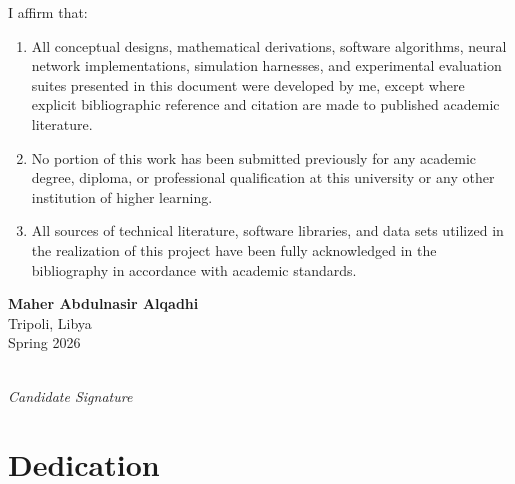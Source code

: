 \documentclass[12pt,a4paper,oneside]{report}
\begin{document}
I affirm that:
\begin{enumerate}
    \item All conceptual designs, mathematical derivations, software algorithms, neural network implementations, simulation harnesses, and experimental evaluation suites presented in this document were developed by me, except where explicit bibliographic reference and citation are made to published academic literature.
    \item No portion of this work has been submitted previously for any academic degree, diploma, or professional qualification at this university or any other institution of higher learning.
    \item All sources of technical literature, software libraries, and data sets utilized in the realization of this project have been fully acknowledged in the bibliography in accordance with academic standards.
\end{enumerate}

\vspace{2.0cm}

\noindent
\begin{minipage}{0.5\textwidth}
    \begin{flushleft}
        \textbf{Maher Abdulnasir Alqadhi}\\
        Tripoli, Libya\\
        Spring 2026
    \end{flushleft}
\end{minipage}
\hfill
\begin{minipage}{0.4\textwidth}
    \begin{flushright}
        \dotfill\\
        \emph{Candidate Signature}
    \end{flushright}
\end{minipage}

\clearpage

\chapter*{Dedication}
\end{document}
